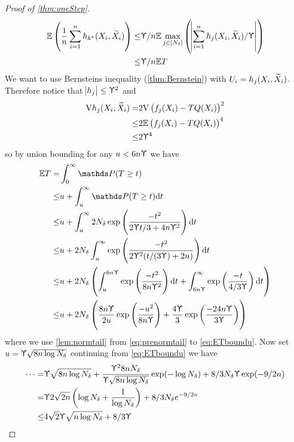 \begin{proof}[Proof of \cref{thm:oneStep}]
  \begin{align}
    \mathbb{E} \left( \frac{1}{n} \sum_{i=1}^n h_{k^*}(X_i, \widetilde{X}_i) \right)
    \leq & \Upupsilon/n \mathbb{E} \max_{j \in [N_\delta]} \left(
    \abs{\sum_{i=1}^n h_j(X_i, \widetilde{X}_i)/\Upupsilon} \right)
    \\ \leq & \Upupsilon/n \mathbb{E} T 
    \label{eq:havgbound}
  \end{align}
  We want to use Bernsteins inequality (\cref{thm:Bernstein}) with
  $U_i = h_j(X_i,\widetilde{X}_i)$. Therefore notice that
  $\abs{h_j} \leq \Upupsilon^2$ and
  \begin{align}
    \mathrm{V} h_j(X_i, \widetilde{X}_i) = & 2 \mathrm{V} \left( f_j(X_i) - TQ(X_i) \right)^2
    \\ \leq & 2 \mathbb{E} \left( f_j(X_i) - TQ(X_i) \right)^4
    \\ \leq & 2 \Upupsilon^4
    \label{eq:hvarbound}
  \end{align}
  so by union bounding for any $u < 6 n \Upupsilon$ we have
  \begin{align}
    \E T = & \int_0^\infty \Prob(T \geq t)
    \\ \leq & u + \int_u^\infty \Prob(T \geq t) \difd t
    \\ \leq & u + \int_u^\infty 2 N_\delta
    \exp \left( \frac{-t^2}{2 \Yp t/3 + 4n \Yp^2} \right) \difd t
    \\ \leq & u + 2 N_\delta \int_u^\infty 
    \exp \left( \frac{-t^2}{2 \Yp^2 (t/(3 \Yp) + 2 n )} \right) \difd t
    \\ \leq & u + 2 N_\delta \left(
      \int_u^{6 n \Yp} \exp \left( \frac{-t^2}{8 n \Yp^2} \right) \difd t
      + \int_{6 n \Yp}^\infty \exp \left( \frac{-t}{4/3 \Yp} \right) \difd t
    \right) 
    \label{eq:prenormtail}
    \\ \leq & u + 2 N_\delta \left(
      \frac{8 n \Yp}{2 u} \exp\left( \frac{-u^2}{8 n \Yp} \right)
      + \frac{4 \Yp}{3} \exp\left( \frac{-24 n \Yp}{3 \Yp} \right)
    \right) 
    \label{eq:ETboundu}
  \end{align}
  where we use \cref{lem:normtail}
  from \cref{eq:prenormtail} to \cref{eq:ETboundu}.
  Now set $u = \Upupsilon \sqrt{8 n \log N_\delta}$
  continuing from \cref{eq:ETboundu} we have
  \begin{align}
    \dots = & \Yp \sqrt{8 n \log N_\delta}
    + \frac{\Yp^2 8 n N_\delta}{\Yp \sqrt{8 n \log N_\delta}}
    \exp(-\log N_\delta) + 8/3 N_\delta \Yp \exp(-9/2 n)
    \\ = & \Yp 2 \sqrt{2n} \left( \log N_\delta + \frac{1}{\log N_\delta} \right)
    + 8/3 N_\delta e^{-9/2 n}
    \\ \leq & 4 \sqrt{2} \Yp \sqrt{n \log N_\delta} + 8/3 \Yp

\end{align}
\end{proof}
